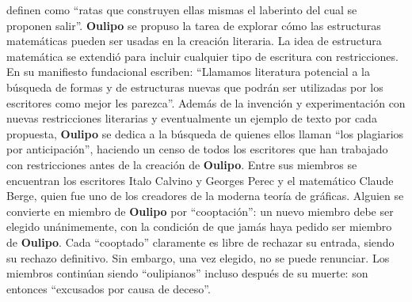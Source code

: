 \documentclass[12pt]{article}
\theoremstyle{definition}
\begin{document}
definen como ``ratas que construyen ellas mismas el laberinto del cual se 
proponen salir''. \textbf{Oulipo} se propuso la tarea de explorar cómo las 
estructuras matemáticas pueden ser usadas en la creación literaria. La idea de 
estructura matemática se extendió para incluir cualquier tipo de escritura con 
restricciones. En su manifiesto fundacional escriben: ``Llamamos literatura 
potencial a la búsqueda de formas y de estructuras nuevas que podrán ser 
utilizadas por los escritores como mejor les parezca''. 
Además de la invención y experimentación con nuevas restricciones literarias y 
eventualmente un ejemplo de texto por cada propuesta, \textbf{Oulipo} se dedica 
a la búsqueda de quienes ellos llaman ``los plagiarios por anticipación'', 
haciendo un censo de todos los escritores que han trabajado con restricciones 
antes de la creación de \textbf{Oulipo}. Entre sus miembros se encuentran los 
escritores Italo Calvino y Georges Perec y el matemático Claude Berge, quien fue 
uno de los creadores de la moderna teoría de gráficas. Alguien se convierte en 
miembro de \textbf{Oulipo} por ``cooptación'': un nuevo miembro debe ser elegido 
unánimemente, con la condición de que jamás haya pedido ser miembro de 
\textbf{Oulipo}. Cada ``cooptado'' claramente es libre de rechazar su entrada, 
siendo su rechazo definitivo. Sin embargo, una vez elegido, no se puede 
renunciar. Los miembros continúan siendo ``oulipianos'' incluso después de su 
muerte: son entonces ``excusados por causa de deceso''.
\end{document}
